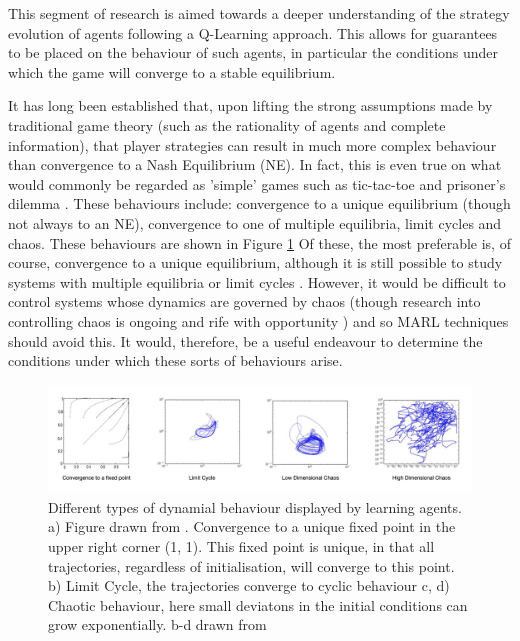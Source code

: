 \documentclass[.../main.tex]{subfiles}
\begin{document}
    This segment of research is aimed towards a deeper understanding of the strategy evolution
    of agents following a Q-Learning approach. This allows for guarantees to be placed on the
    behaviour of such agents, in particular the conditions under which the game will converge to a
    stable equilibrium.

    It has long been established that, upon lifting the strong assumptions made by traditional
    game theory (such as the rationality of agents and complete information), that player
    strategies can result in much more complex behaviour than convergence to a Nash Equilibrium 
    (NE). In fact, this is even true on what would commonly be regarded as 'simple' games such
    as tic-tac-toe and prisoner's dilemma \cite{Galla2011, Sato2002}. These
    behaviours include: convergence to a unique equilibrium (though not always to an NE),
    convergence to one of multiple equilibria, limit cycles and chaos. These behaviours are shown in
    Figure \ref{fig::DynamicalBehaviours} Of these, the most preferable is, of course, convergence to a unique equilibrium,
    although it is still possible to study systems with multiple equilibria or limit cycles 
    \cite{Strogatz2000}. However, it would be difficult to control systems whose dynamics
    are governed by chaos (though research into controlling chaos is ongoing and rife with
    opportunity \cite{Fradkov2009}) and so MARL techniques should avoid this. It would,
    therefore, be a useful endeavour to determine the conditions under which these sorts of
    behaviours arise.

    \begin{figure}[h]
    	\centering
    	\includegraphics[width=1.1\textwidth]{Figures/DynamicalBehaviours}
    	\caption{ \label{fig::DynamicalBehaviours} Different types of dynamial behaviour
       displayed
    	by learning agents. a) Figure drawn from \cite{Tuyls2006AnGames}.
    	Convergence
    	to a unique fixed point in the upper right corner (1, 1). This fixed point is unique, in
    	that all trajectories, regardless of initialisation, will converge to this point. b) Limit Cycle, the trajectories converge to cyclic behaviour c,
    	d) Chaotic behaviour, here small deviatons in the initial conditions can grow
    	exponentially. b-d drawn from \cite{Sanders2018}}
    \end{figure}
\end{document}
